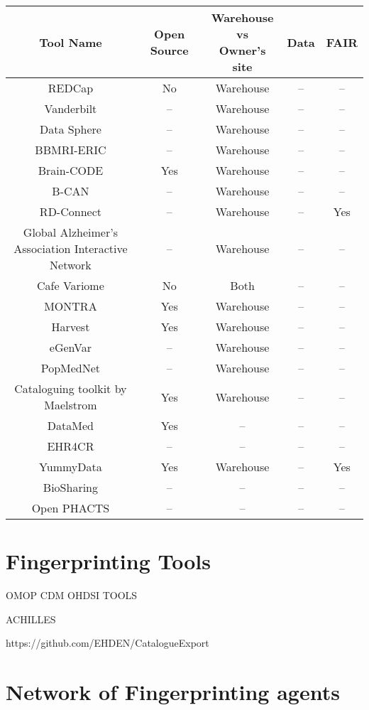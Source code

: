\begin{tabular}{ | c | c | c | c | c | }
\hline 
Tool Name & Open Source & \makecell{Warehouse \\ vs \\ Owner's site}  & Data & FAIR\\
\hline
REDCap \cite{redcap} & No & Warehouse & -- & -- \\
\hline
Vanderbilt \cite{vanderbilt} & -- & Warehouse & -- & -- \\
\hline
Data Sphere \cite{datasphere} & -- & Warehouse & -- & -- \\
\hline
BBMRI-ERIC \cite{bbmrieric} & -- & Warehouse & -- & -- \\
\hline
Brain-CODE \cite{braincode} & Yes & Warehouse & -- & -- \\
\hline
B-CAN \cite{bcan} & -- & Warehouse & -- & -- \\
\hline
RD-Connect \cite{rdconnect} & -- & Warehouse & -- & Yes \\
\hline
\makecell{Global Alzheimer's \\Association Interactive\\ Network} \cite{gaain} & -- & Warehouse & -- & -- \\
\hline
Cafe Variome \cite{cafevariome} & No & Both & -- & -- \\
\hline
MONTRA \cite{montra} & Yes & Warehouse & -- & -- \\
\hline
Harvest \cite{harvest} & Yes & Warehouse & -- & -- \\
\hline
eGenVar \cite{egenvar} & -- & Warehouse & -- & -- \\
\hline
PopMedNet \cite{popmednet} & -- & Warehouse & -- & -- \\
\hline
Cataloguing toolkit by Maelstrom \cite{maelstrom} & Yes & Warehouse & -- & -- \\
\hline
DataMed \cite{datamed} & Yes & -- & -- & -- \\
\hline
EHR4CR \cite{ehr4cr} & -- & -- & -- & -- \\
\hline
YummyData \cite{yummydata} & Yes & Warehouse & -- & Yes \\
\hline
BioSharing \cite{biosharing} & -- & -- & -- & -- \\
\hline
Open PHACTS \cite{phacts} & -- & -- & -- & -- \\
\hline
\end{tabular}

\section{Fingerprinting Tools}

OMOP CDM
OHDSI TOOLS 

ACHILLES

https://github.com/EHDEN/CatalogueExport

\section{Network of Fingerprinting agents}

